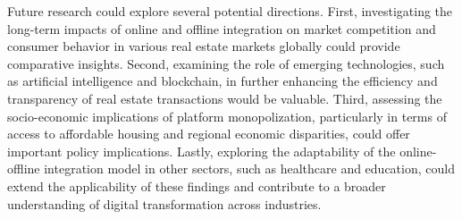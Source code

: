 \documentclass[11pt]{article}
\begin{document}
Future research could explore several potential directions. First, investigating the long-term impacts of online and offline integration on market competition and consumer behavior in various real estate markets globally could provide comparative insights. Second, examining the role of emerging technologies, such as artificial intelligence and blockchain, in further enhancing the efficiency and transparency of real estate transactions would be valuable. Third, assessing the socio-economic implications of platform monopolization, particularly in terms of access to affordable housing and regional economic disparities, could offer important policy implications. Lastly, exploring the adaptability of the online-offline integration model in other sectors, such as healthcare and education, could extend the applicability of these findings and contribute to a broader understanding of digital transformation across industries.

\end{document}
